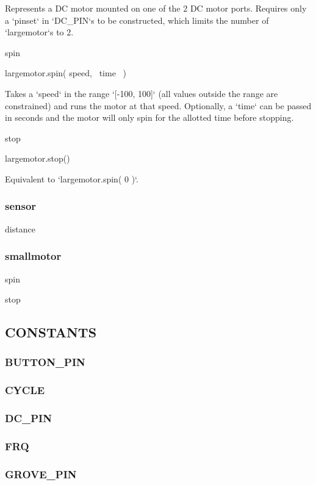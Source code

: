 \documentclass[leqno]{article}
\begin{document}
Represents a DC motor mounted on one of the 2 DC motor ports. Requires only a
`pinset` in `DC\_PIN`s to be constructed, which limits the number of
`largemotor`s to 2.

spin

    largemotor.spin( speed, ~time~ )

Takes a `speed` in the range `[-100, 100]` (all values outside the range are
constrained) and runs the motor at that speed. Optionally, a `time` can be
passed in seconds and the motor will only spin for the allotted time before
stopping.

stop

    largemotor.stop()

Equivalent to `largemotor.spin( 0 )`.

\subsubsection{sensor}

distance

\subsubsection{smallmotor}

spin

stop

\subsection{CONSTANTS}

\subsubsection{BUTTON\_PIN}

\subsubsection{CYCLE}

\subsubsection{DC\_PIN}

\subsubsection{FRQ}

\subsubsection{GROVE\_PIN}
\end{document}
